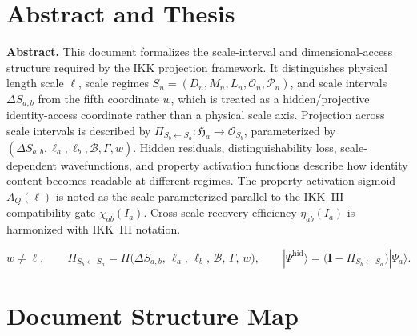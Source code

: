 \documentclass[11pt,a4paper,oneside]{article}
\newcommand{\Ia}{I_a}                               %
\newcommand{\Ha}{\mathfrak{H}_a}               %
\newcommand{\OspS}[1]{\mathcal{O}_{S_{#1}}}  %
\newcommand{\DSab}{\Delta S_{a,b}}             %
\newcommand{\wcoord}{w}
\newcommand{\PiS}[2]{\Pi_{S_{#2}\leftarrow S_{#1}}}  %
\newcommand{\etaab}{\eta_{ab}}                 %
\newcommand{\AQ}{A_Q(\ell)}                    %
\newcommand{\chiab}{\chi_{ab}}                 %
\begin{document}
\section{Abstract and Thesis}

\textbf{Abstract.}
This document formalizes the scale-interval and dimensional-access structure required by the IKK projection framework. It distinguishes physical length scale $\ell$, scale regimes $S_n = (D_n, M_n, L_n, \mathcal{O}_n, \mathcal{P}_n)$, and scale intervals $\DSab$ from the fifth coordinate $\wcoord$, which is treated as a hidden/projective identity-access coordinate rather than a physical scale axis. Projection across scale intervals is described by $\PiS{a}{b} : \Ha \to \OspS{b}$, parameterized by $(\DSab, \ell_a, \ell_b, \mathcal{B}, \Gamma, \wcoord)$. Hidden residuals, distinguishability loss, scale-dependent wavefunctions, and property activation functions describe how identity content becomes readable at different regimes. The property activation sigmoid $\AQ$ is noted as the scale-parameterized parallel to the IKK~III compatibility gate $\chiab(\Ia)$. Cross-scale recovery efficiency $\etaab(\Ia)$ is harmonized with IKK~III notation.

\[
\boxed{
\wcoord \neq \ell,\qquad
\PiS{a}{b} = \Pi\!\big(\DSab,\, \ell_a,\, \ell_b,\, \mathcal{B},\, \Gamma,\, \wcoord\big),\qquad
|\Psi^{\mathrm{hid}}\rangle = \big(\mathbf{I} - \PiS{a}{b}\big)|\Psi_a\rangle.
}
\]

\section{Document Structure Map}
\end{document}
